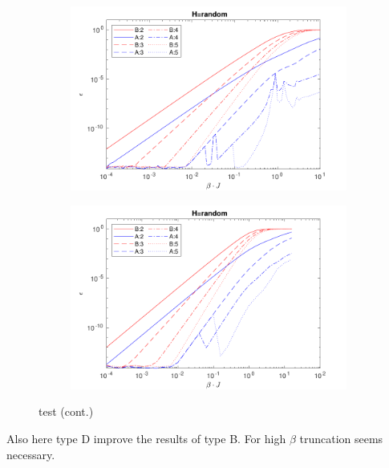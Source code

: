 \begin{figure}[H]\ContinuedFloat
    \begin{subfigure}[]{\textwidth}
        \includegraphics[width=\textwidth]{Figuren/benchmarking/rand_03.pdf}
    \end{subfigure}

    \begin{subfigure}[]{\textwidth}
        \includegraphics[width=\textwidth]{Figuren/benchmarking/rand_04.pdf}
    \end{subfigure}
    \caption{test (cont.) }
    \label{fig:benchmark:Random}
\end{figure}


Also here type D improve the results of type B. For high $\beta$ truncation seems necessary. 

